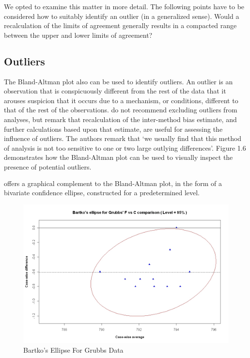 \documentclass[12pt, a4paper]{report}
\theoremstyle{plain}
\theoremstyle{definition}
\theoremstyle{remark}
\begin{document}
We opted to examine this
matter in more detail. The following points have to be considered how to suitably identify an outlier (in a generalized sense). Would a recalculation of the limits of agreement generally results in a compacted range between the upper and lower limits of agreement?
\subsection{Outliers}
The Bland-Altman plot also can be used to identify outliers. An outlier is an observation that is conspicuously different from the rest of the data that it arouses suspicion that it occurs due to a mechanism, or conditions, different to that of the rest of the observations. \citet*{BA99} do not recommend excluding outliers from analyses,
but remark that recalculation of the inter-method bias estimate,
and further calculations based upon that estimate, are useful for
assessing the influence of outliers. The authors remark that `we
usually find that this method of analysis is not too sensitive to
one or two large outlying differences'. Figure 1.6 demonstrates how the Bland-Altman plot can be used to visually inspect the presence of potential outliers.


\citet{Bartko} offers a graphical complement to the Bland-Altman
plot, in the form of a bivariate confidence ellipse, constructed for a
predetermined level.

\begin{figure}[h!]
	\includegraphics[width=130mm]{images/GrubbsBartko.jpeg}
	\caption{Bartko's Ellipse For Grubbs Data}\label{GrubbsBartko}
\end{figure}
\end{document}
